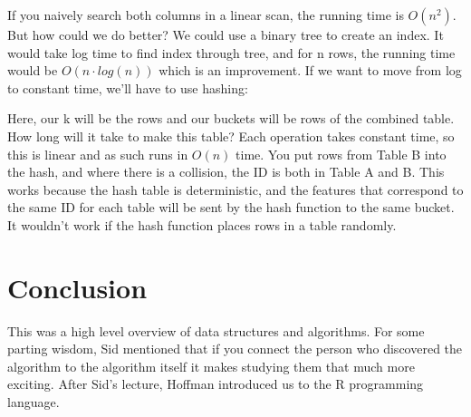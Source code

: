 If you naively search both columns in a linear scan, the running time is $O(n^{2})$. But how could we do better? We could use a binary tree to create an index. It would take log time to find index through tree, and for n rows, the running time would be $O(n \cdot log(n)) $ which is an improvement. If we want to move from log to constant time, we'll have to use hashing: \\


Here, our k will be the rows and our buckets will be rows of the combined table. How long will it take to make this table? Each operation takes constant time, so this is linear and as such runs in $O(n)$ time. You put rows from Table B into the hash, and where there is a collision, the ID is both in Table A and B. This works because the hash table is deterministic, and the features that correspond to the same ID for each table will be sent by the hash function to the same bucket. It wouldn't work if the hash function places rows in a table randomly. 

\section{Conclusion}

This was a high level overview of data structures and algorithms. For some parting wisdom, Sid mentioned that if you connect the person who discovered the algorithm to the algorithm itself it makes studying them that much more exciting. After Sid's lecture, Hoffman introduced us to the R programming language. 

